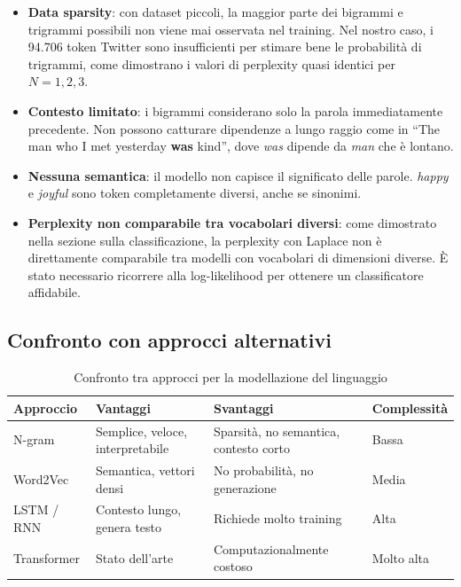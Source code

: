 \documentclass[12pt, a4paper]{article}
\begin{document}
\begin{itemize}[leftmargin=1.5cm]
    \item \textbf{Data sparsity}: con dataset piccoli, la maggior parte
          dei bigrammi e trigrammi possibili non viene mai osservata nel
          training. Nel nostro caso, i 94.706 token Twitter sono
          insufficienti per stimare bene le probabilità di trigrammi,
          come dimostrano i valori di perplexity quasi identici per
          $N=1,2,3$.

    \item \textbf{Contesto limitato}: i bigrammi considerano solo la
          parola immediatamente precedente. Non possono catturare
          dipendenze a lungo raggio come in ``The man who I met
          yesterday \textbf{was} kind'', dove \textit{was} dipende
          da \textit{man} che è lontano.

    \item \textbf{Nessuna semantica}: il modello non capisce il
          significato delle parole. \textit{happy} e \textit{joyful}
          sono token completamente diversi, anche se sinonimi.

    \item \textbf{Perplexity non comparabile tra vocabolari diversi}:
          come dimostrato nella sezione sulla classificazione, la
          perplexity con Laplace non è direttamente comparabile tra
          modelli con vocabolari di dimensioni diverse. È stato
          necessario ricorrere alla log-likelihood per ottenere un
          classificatore affidabile.
\end{itemize}

\subsection{Confronto con approcci alternativi}

\begin{table}[H]
\centering
\begin{tabular}{p{2.5cm}p{3.5cm}p{3.5cm}p{2cm}}
\toprule
\textbf{Approccio} & \textbf{Vantaggi} &
\textbf{Svantaggi} & \textbf{Complessità} \\
\midrule
N-gram &
Semplice, veloce, interpretabile &
Sparsità, no semantica, contesto corto &
Bassa \\
\midrule
Word2Vec &
Semantica, vettori densi &
No probabilità, no generazione &
Media \\
\midrule
LSTM / RNN &
Contesto lungo, genera testo &
Richiede molto training &
Alta \\
\midrule
Transformer &
Stato dell'arte &
Computazionalmente costoso &
Molto alta \\
\bottomrule
\end{tabular}
\caption{Confronto tra approcci per la modellazione del linguaggio}
\end{table}
\end{document}
